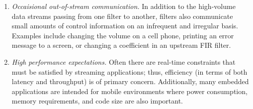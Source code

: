 \begin{enumerate}
\item {\it Occaisional out-of-stream communication.}  In addition to
the high-volume data streams passing from one filter to another,
filters also communicate small amounts of control information on an
infrequent and irregular basis.  Examples include changing the volume
on a cell phone, printing an error message to a screen, or changing a
coefficient in an upstream FIR filter.

\item {\it High performance expectations.}  Often there are real-time
constraints that must be satisfied by streaming applications; thus,
efficiency (in terms of both latency and throughput) is of primary
concern.  Additionally, many embedded applications are intended for
mobile environments where power consumption, memory requirements, and
code size are also important.

\end{enumerate}

 





